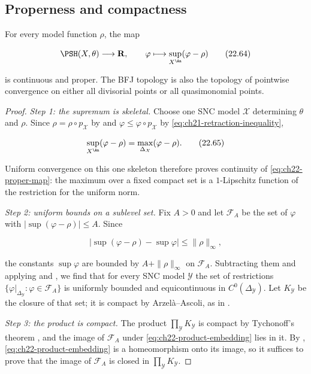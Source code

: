 \subsection{Properness and compactness}

\begin{theorem}\label{thm:ch22-proper-normalization}
For every model function \(\rho\), the map

\[
 \PSH(X,\theta)\longrightarrow\mathbf R,
 \qquad
 \varphi\longmapsto\sup_{X^{\An}}(\varphi-\rho)
\tag{22.64}\label{eq:ch22-proper-map}
\]

is continuous and proper.  The BFJ topology is also the topology of
pointwise convergence on either all divisorial points or all quasimonomial
points.
\end{theorem}

\begin{proof}
\emph{Step 1: the supremum is skeletal.}  Choose one SNC model
\(\mathcal X\) determining \(\theta\) and \(\rho\).  Since
\(\rho=\rho\circ p_{\mathcal X}\) by
 and
\(\varphi\leq\varphi\circ p_{\mathcal X}\) by
\eqref{eq:ch21-retraction-inequality},

\[
 \sup_{X^{\An}}(\varphi-\rho)
 =\max_{\Delta_{\mathcal X}}(\varphi-\rho).
\tag{22.65}\label{eq:ch22-proper-map-skeletal}
\]

Uniform convergence on this one skeleton therefore proves continuity of
\eqref{eq:ch22-proper-map}: the maximum over a fixed compact set is a
\(1\)-Lipschitz function of the restriction for the uniform norm.

\emph{Step 2: uniform bounds on a sublevel set.}  Fix \(A>0\) and let
\(\mathcal F_A\) be the set of \(\varphi\) with
\(|\sup(\varphi-\rho)|\leq A\).  Since

\[
 \bigl|\sup(\varphi-\rho)-\sup\varphi\bigr|
       \leq\|\rho\|_{\infty},
\]

the constants \(\sup\varphi\) are bounded by
\(A+\|\rho\|_\infty\) on \(\mathcal F_A\).  Subtracting them and applying
 and
, we find that for every SNC model
\(\mathcal Y\) the set of restrictions
\(\{\varphi|_{\Delta_{\mathcal Y}}:\varphi\in\mathcal F_A\}\) is uniformly
bounded and equicontinuous in \(C^0(\Delta_{\mathcal Y})\).  Let
\(K_{\mathcal Y}\) be the closure of that set; it is compact by
Arzel\`a--Ascoli, as in .

\emph{Step 3: the product is compact.}  The product
\(\prod_{\mathcal Y}K_{\mathcal Y}\) is compact by Tychonoff's theorem
\cite[Chapter~5]{Kel75}, and the image of \(\mathcal F_A\) under
\eqref{eq:ch22-product-embedding} lies in it.  By
, \eqref{eq:ch22-product-embedding} is a
homeomorphism onto its image, so it suffices to prove that the image of
\(\mathcal F_A\) is closed in \(\prod_{\mathcal Y}K_{\mathcal Y}\).


\end{proof}
